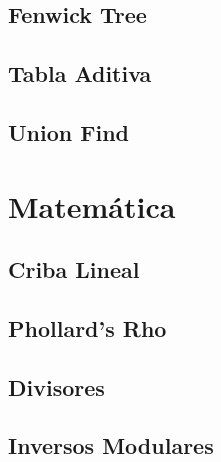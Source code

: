 \documentclass[a4paper,11pt,landscape,twocolumn]{article}
\begin{document}


\subsection{Fenwick Tree}



\subsection{Tabla Aditiva}



\subsection{Union Find}



\section{Matemática}

\subsection{Criba Lineal}



\subsection{Phollard's Rho}



\subsection{Divisores}



\subsection{Inversos Modulares}




\end{document}
